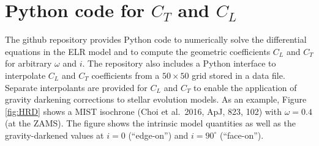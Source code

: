 \documentclass[12pt]{article}
\begin{document}
\section{Python code for $C_T$ and $C_L$}
The github repository provides Python code to numerically solve the differential equations in the ELR model
and to compute the geometric coefficients $C_L$ and $C_T$ for arbitrary $\omega$ and $i$. The repository
also includes a Python interface to interpolate $C_L$ and $C_T$ coefficients from a $50\times50$ grid
stored in a data file.  Separate interpolants are provided for $C_L$ and $C_T$ to enable the application
of gravity darkening corrections to stellar evolution models. As an example, Figure \ref{fig:HRD} shows
a MIST isochrone (Choi et al.\ 2016, ApJ, 823, 102) with $\omega=0.4$ (at the ZAMS). The figure shows the
intrinsic model quantities as well as the gravity-darkened values at $i=0$ (``edge-on'') and $i=90^{\circ}$
(``face-on'').
\end{document}
